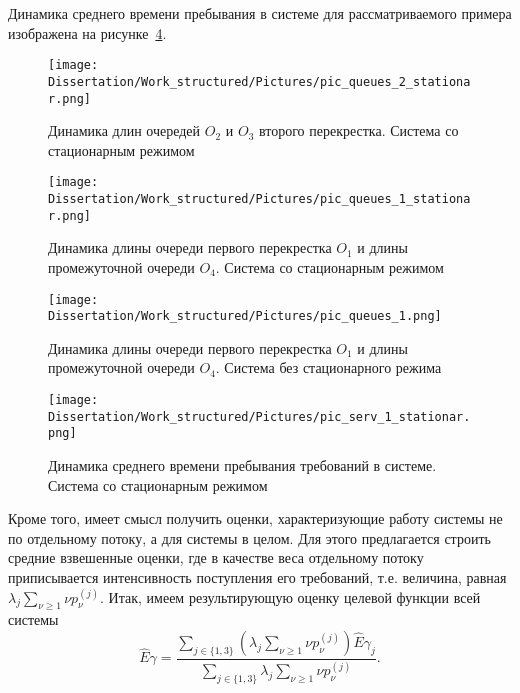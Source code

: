 Динамика среднего времени пребывания в системе для рассматриваемого примера изображена на рисунке~\ref{Experiment:serv:stationar}.
\begin{figure}[t]
\centering
\texttt{[image: Dissertation/Work\_structured/Pictures/pic\_queues\_2\_stationar.png]}
\caption{Динамика длин очередей $O_2$ и $O_3$ второго перекрестка. Система со стационарным режимом}
\label{Experiment:queues:2:stationar}
\end{figure}
\begin{figure}[t]
\centering
\texttt{[image: Dissertation/Work\_structured/Pictures/pic\_queues\_1\_stationar.png]}
\caption{Динамика длины очереди первого перекрестка $O_1$ и длины промежуточной очереди $O_4$. Система со стационарным режимом}
\label{Experiment:queues:1:stationar}
\end{figure}
\begin{figure}[t]
\centering
\texttt{[image: Dissertation/Work\_structured/Pictures/pic\_queues\_1.png]}
\caption{Динамика длины очереди первого перекрестка $O_1$ и длины промежуточной очереди $O_4$. Система без стационарного режима}
\label{Experiment:queues:1:nonstationar}
\end{figure}
\begin{figure}[t]
\centering
\texttt{[image: Dissertation/Work\_structured/Pictures/pic\_serv\_1\_stationar.png]}
\caption{Динамика среднего времени пребывания требований в системе. Система со стационарным режимом}
\label{Experiment:serv:stationar}
\end{figure}
%
Кроме того, имеет смысл получить оценки, характеризующие работу системы не по отдельному потоку, а для системы в целом. Для этого предлагается строить средние взвешенные оценки, где в качестве веса отдельному потоку приписывается интенсивность поступления его требований, т.е. величина, равная $\lambda_j \sum_{\nu\geqslant1}\nu p_{\nu}^{(j)}$. Итак, имеем результирующую оценку целевой функции всей системы
\begin{equation*}
    \hat{E}\gamma=\frac{\sum_{j\in\{1,3\}} (\lambda_j \sum_{\nu\geqslant1}\nu p_{\nu}^{(j)})\hat{E}\gamma_{j} }{\sum_{j\in\{1,3\}} \lambda_j \sum_{\nu\geqslant1}\nu p_{\nu}^{(j)}}.
\end{equation*}




